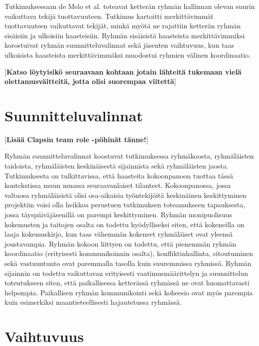 Tutkimuksessaan de Melo et al. \cite{DEOMELO2013412} toteavat ketterän ryhmän hallinnan olevan suurin vaikuttava tekijä tuottavuuteen. Tutkimus kartoitti merkittävimmät tuottavuuteen vaikuttavat tekijät, minkä myötä ne rajattiin ketterän ryhmän sisäisiin ja ulkoisiin haasteisiin. Ryhmän sisäisistä haasteista merkittävimmiksi korostuivat ryhmän suunnitteluvalinnat sekä jäsenten vaihtuvuus, kun taas ulkoisista haasteista merkittävimmäksi muodostui ryhmien välinen koordinaatio.

[\textbf{Katso löytyisikö seuraavaan kohtaan jotain lähteitä tukemaan vielä olettamusväitteitä, jotta olisi suorempaa viitettä}]


\section{Suunnitteluvalinnat}

[\textbf{Lisää Clapsin team role -pöhinät tänne!}]

Ryhmän suunnitteluvalinnat koostuvat tutkimuksessa \cite{DEOMELO2013412} ryhmäkoosta, ryhmäläisten taidoista, ryhmäläisten keskinäisestä sijainnista sekä ryhmäläisten jaosta. Tutkimuksesta on tulkittavissa, että haasteita kokoonpanoon tuottaa tässä kontekstissa muun muassa seuraavanlaiset tilanteet. Kokoonpanossa, jossa valtaosa ryhmäläisistä olisi osa-aikaisia työntekijöitä keskinäinen keskittyminen projektiin voisi olla heikkoa perustuen tutkimuksen toteamukseen tapauksesta, jossa täyspäiväjäsenillä on parempi keskittyminen. Ryhmän monipuolisuus kokemusten ja taitojen osalta on todettu hyödylliseksi siten, että kokeneilla on laaja kokemuskirjo, kun taas vähemmän kokeneet ryhmäläiset ovat yleensä joustavampia. Ryhmän kokoon liittyen on todettu, että pienemmän ryhmän koordinaatio (erityisesti kommunikoinnin osalta), konfliktinhallinta, sitoutuminen sekä vastuuntunto ovat paremmalla tasolla kuin suuremmissa ryhmissä. Ryhmän sijainnin on todettu vaikuttavan erityisesti vaatimusmäärittelyn ja suunnittelun toteutukseen siten, että paikallisessa ketterässä ryhmässä ne ovat huomattavasti helpompia. Paikallisen ryhmän kommunikointi sekä koheesio ovat myös parempia kuin esimerkiksi maantieteellisesti hajautetussa ryhmässä.

\section{Vaihtuvuus}

